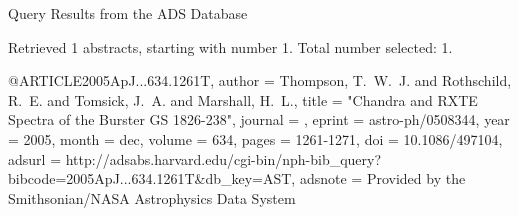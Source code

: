 Query Results from the ADS Database


Retrieved 1 abstracts, starting with number 1.  Total number selected: 1.

@ARTICLE{2005ApJ...634.1261T,
   author = {{Thompson}, T.~W.~J. and {Rothschild}, R.~E. and {Tomsick}, J.~A. and 
	{Marshall}, H.~L.},
    title = "{Chandra and RXTE Spectra of the Burster GS 1826-238}",
  journal = {\apj},
   eprint = {astro-ph/0508344},
     year = 2005,
    month = dec,
   volume = 634,
    pages = {1261-1271},
      doi = {10.1086/497104},
   adsurl = {http://adsabs.harvard.edu/cgi-bin/nph-bib_query?bibcode=2005ApJ...634.1261T&db_key=AST},
  adsnote = {Provided by the Smithsonian/NASA Astrophysics Data System}
}



